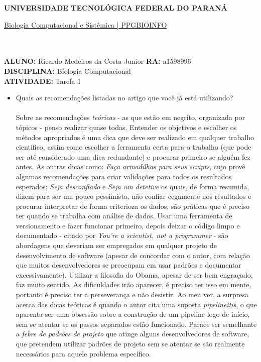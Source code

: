 \documentclass[a4paper, 12pt]{article}
\begin{document}
\textbf{UNIVERSIDADE TECNOLÓGICA FEDERAL DO PARANÁ}\\
\centerline{\underline{Biologia Computacional e Sistêmica | PPGBIOINFO}}\\\\
\textbf{ALUNO:} Ricardo Medeiros da Costa Junior   \textbf{RA:} a1598996 \\
\textbf{DISCIPLINA:} Biologia Computacional \\
\textbf{ATIVIDADE:} Tarefa 1 \\
\begin{itemize} 
\item Quais as recomendações listadas no artigo que você já está utilizando? \\ \\
  Sobre as recomendações \emph{teóricas} - as que estão em negrito, organizada por tópicos - penso realizar quase todas. Entender os objetivos e escolher os métodos apropriados é uma dica que deve ser realizado em qualquer trabalho científico, assim como escolher a ferramenta certa para o trabalho (que pode ser até considerado uma dica redundante) e procurar primeiro se alguém fez antes. As outras dicas como: \emph{Faça armadilhas para seus scripts}, cujo provê algumas recomendações para criar validações para todos os resultados esperados; \emph{Seja desconfiado} e \emph{Seja um detetive} os quais, de forma resumida, dizem para ser um pouco pessimista, não confiar cegamente nos resultados e procurar interpretar de forma criterioza os dados, são práticas que é preciso ter quando se trabalha com análise de dados. Usar uma ferramenta de versionamento e fazer funcionar primeiro, depois deixar o código limpo e documentado - citado por \emph{You're a scientist, not a programmer} - são abordagens que deveriam ser empregados em qualquer projeto de desenvolvimento de software (apesar de concordar com o autor, com relação que muitos desenvolvedores se preocupam em usar padrões e documentar excessivamente). Utilizar a filosofia do Obama, apesar de ser bem engraçado, faz muito sentido. As dificuldades irão aparecer, é preciso ter isso em mente, portanto é preciso ter a perseverança e não desistir. Ao meu ver, a surpresa acerca das dicas teóricas é quando o autor cita uma suposta \emph{pipelineitis}, o que aparenta ser uma obsessão sobre a construção de um pipeline logo de início, sem se atentar se os passos separados estão funcionado. Parace ser semelhante a \emph{febre de padrões de projeto} que atinge alguns desenvolvedores de software, que pretendem utilizar padrões de projeto sem se atentar se são realmente necessários para aquele problema específico.  \\

\end{itemize}
\end{document}

